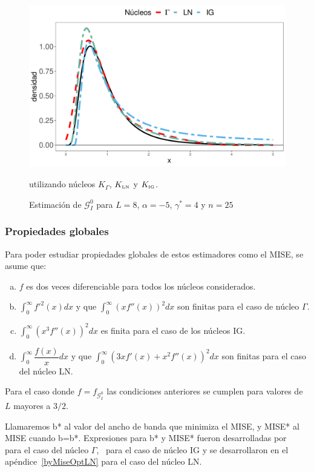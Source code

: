 \begin{figure}[hbt]
	\centering
	\includegraphics[scale=0.5]{../../Figures/Tesis/Capitulo5/NucleosGALNyIG.pdf}
	\caption{\label{EstimacionLNyGAyIG}Estimación de $\mathcal{G}_I^0$ para $L=8$, $\alpha=-5$, $\gamma^*=4$ y $n=25$} utilizando núcleos $K_{\Gamma}$, $K_{\text{\tiny{LN}}}$ y $K_{\text{\tiny{IG}}}$.
\end{figure}

\subsubsection{Propiedades globales}
\label{PropiedadesGlobales}

Para poder estudiar propiedades globales de estos estimadores como el MISE, se asume que:

\begin{enumerate}[a)]
	\label{CondPropGlobales}
	\item $f$ es dos veces diferenciable para todos los núcleos considerados.
	\item $\displaystyle{\int_0^{\infty}}  f'^2(x) dx$ y que $\displaystyle{\int_0^{\infty}}  (x f''(x))^2 dx$ son finitas para el caso de núcleo $\Gamma$.
	\item $\displaystyle{\int_0^{\infty}}  (x^3 f''(x))^2 dx$ es finita para el caso de los núcleos IG.
	\item $\displaystyle{\int_0^{\infty}}  \dfrac{f(x)}{x} dx$ y que $\displaystyle{\int_0^{\infty}}  (3 x f'(x)+x^2 f''(x))^2 dx$ son finitas para el caso del núcleo LN.
\end{enumerate}
Para el caso donde $f=f_{\mathcal{G}_I^0}$ las condiciones anteriores se cumplen para valores de $L$ mayores a $3/2$.

Llamaremos b* al valor del ancho de banda que minimiza el MISE, y MISE* al MISE cuando b=b*. Expresiones para b* y MISE* fueron desarrolladas por~\citet{chensx2000} para el caso del núcleo $\Gamma$,~\citet{Scaillet2004} para el caso de núcleo IG  y se desarrollaron en el apéndice~\ref{byMiseOptLN} para el caso del núcleo LN. 

